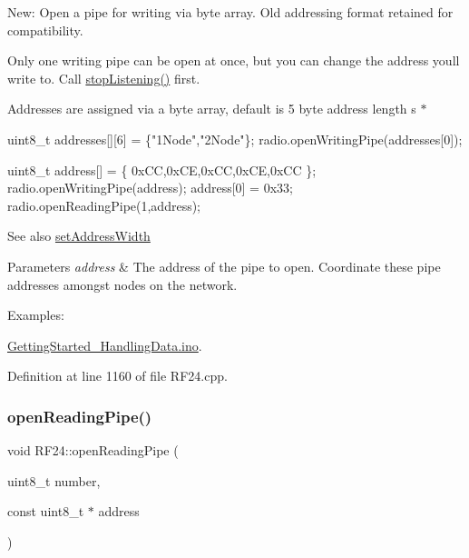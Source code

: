 New\+: Open a pipe for writing via byte array. Old addressing format retained for compatibility.

Only one writing pipe can be open at once, but you can change the address you\textquotesingle{}ll write to. Call \hyperlink{classRF24_a6f144d73fc447c8ac2d1a4166210fd88}{stop\+Listening()} first.

Addresses are assigned via a byte array, default is 5 byte address length s $\ast$ 
\begin{DoxyCode}
uint8\_t addresses[][6] = \{\textcolor{stringliteral}{"1Node"},\textcolor{stringliteral}{"2Node"}\};
radio.openWritingPipe(addresses[0]);
\end{DoxyCode}
 
\begin{DoxyCode}
uint8\_t address[] = \{ 0xCC,0xCE,0xCC,0xCE,0xCC \};
radio.openWritingPipe(address);
address[0] = 0x33;
radio.openReadingPipe(1,address);
\end{DoxyCode}
 \begin{DoxySeeAlso}{See also}
\hyperlink{classRF24_ad5aea7f9a3bd9c7d357fb296ce751f21}{set\+Address\+Width}
\end{DoxySeeAlso}

\begin{DoxyParams}{Parameters}
{\em address} & The address of the pipe to open. Coordinate these pipe addresses amongst nodes on the network. \\
\hline
\end{DoxyParams}
\begin{Desc}
\item[Examples\+: ]\par
\hyperlink{GettingStarted_HandlingData_8ino-example}{Getting\+Started\+\_\+\+Handling\+Data.\+ino}.\end{Desc}


Definition at line 1160 of file R\+F24.\+cpp.

\mbox{\label{classRF24_a9edc910ccc1ffcff56814b08faca5535}} 
\subsubsection{\texorpdfstring{open\+Reading\+Pipe()}{openReadingPipe()}\hspace{0.1cm}{\footnotesize\ttfamily [1/2]}}
{\footnotesize\ttfamily void R\+F24\+::open\+Reading\+Pipe (\begin{DoxyParamCaption}\item[{uint8\+\_\+t}]{number,  }\item[{const uint8\+\_\+t $\ast$}]{address }\end{DoxyParamCaption})}


